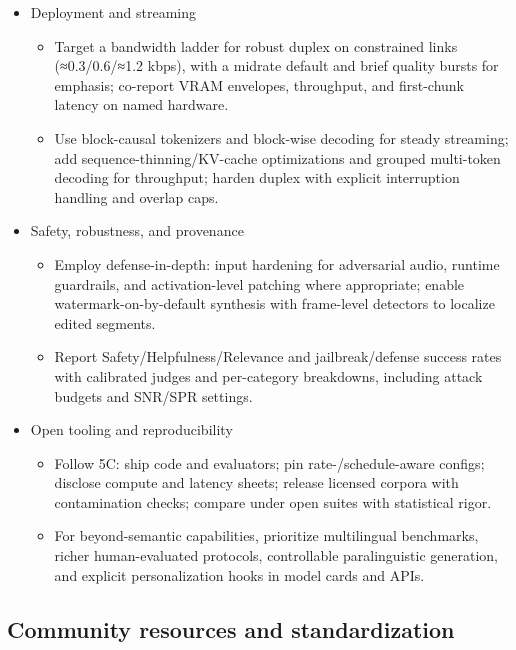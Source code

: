 \begin{itemize}
  \item Deployment and streaming
  \begin{itemize}
    \item Target a bandwidth ladder for robust duplex on constrained links (≈0.3/0.6/≈1.2 kbps), with a midrate default and brief quality bursts for emphasis; co-report VRAM envelopes, throughput, and first-chunk latency on named hardware.
    \item Use block-causal tokenizers and block-wise decoding for steady streaming; add sequence-thinning/KV-cache optimizations and grouped multi-token decoding for throughput; harden duplex with explicit interruption handling and overlap caps.
  \end{itemize}

  \item Safety, robustness, and provenance
  \begin{itemize}
    \item Employ defense-in-depth: input hardening for adversarial audio, runtime guardrails, and activation-level patching where appropriate; enable watermark-on-by-default synthesis with frame-level detectors to localize edited segments.
    \item Report Safety/Helpfulness/Relevance and jailbreak/defense success rates with calibrated judges and per-category breakdowns, including attack budgets and SNR/SPR settings.
  \end{itemize}

  \item Open tooling and reproducibility
  \begin{itemize}
    \item Follow 5C: ship code and evaluators; pin rate-/schedule-aware configs; disclose compute and latency sheets; release licensed corpora with contamination checks; compare under open suites with statistical rigor.
    \item For beyond-semantic capabilities, prioritize multilingual benchmarks, richer human-evaluated protocols, controllable paralinguistic generation, and explicit personalization hooks in model cards and APIs.
  \end{itemize}

\end{itemize}



\subsection{Community resources and standardization} \label{subsec:Community resources and standardization}

